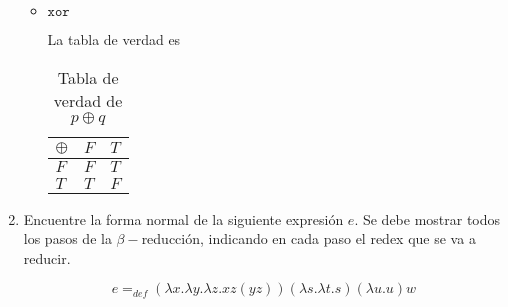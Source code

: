 \documentclass{article}
\begin{document}
\begin{enumerate}
{\begin{itemize}
{\begin{itemize}
{                        }
                        \item {
                            $\texttt{xor}$

                            La tabla de verdad es 

                            \begin{table}[H]
                                \centering
                                \begin{tabular}{|l|l|l|}
                                    \hline
                                    $\oplus$ & $F$ & $T$ \\ \hline
                                    $F$      & $F$ & $T$ \\ \hline
                                    $T$      & $T$ & $F$ \\ \hline
                                \end{tabular}
                                \caption{Tabla de verdad de $p \oplus q$}
                                \label{tab:truth_or}
                            \end{table}
                        }
                    \end{itemize}
                }
            \end{itemize}
        }

        \item {
            Encuentre la forma normal de la siguiente expresión $e$. Se debe
            mostrar todos los pasos de la $\beta-$reducción, indicando en cada
            paso el redex que se va a reducir.

            \[
                e =_{def} (\lambda x. \lambda y. \lambda z.xz(yz))
                (\lambda s. \lambda t.s)
                (\lambda u. u) w
            \]

}
\end{enumerate}
\end{document}
